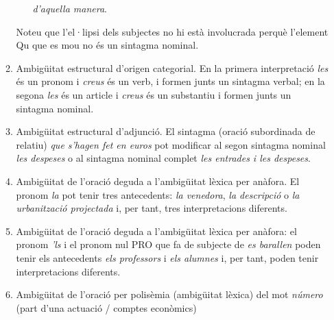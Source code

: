 \begin{enumerate}
\begin{enumerate}
\begin{itemize}
    \emph{d'aquella manera}.
     \end{itemize}
    Noteu que l'el·lipsi dels subjectes no hi està involucrada perquè
    l'element Qu que es mou no és un sintagma nominal.
  \item Ambigüitat estructural d'origen categorial. En la primera
    interpretació \emph{les} és un pronom i \emph{creus} és un verb, i
    formen junts un sintagma verbal; en la segona \emph{les} és un
    article i \emph{creus} és un substantiu i formen junts un sintagma
    nominal.
  \item Ambigüitat estructural d'adjunció. El sintagma (oració
    subordinada de relatiu) \emph{que s'hagen
    fet en euros} pot modificar al segon sintagma nominal \emph{les
    despeses} o al sintagma nominal complet \emph{les entrades i les
    despeses}.
\item Ambigüitat de l'oració deguda a l'ambigüitat lèxica per anàfora.
  El pronom \emph{la} pot tenir tres antecedents: \emph{la venedora},
  \emph{la descripció} o \emph{la urbanització projectada} i, per
  tant, tres interpretacions diferents.
\item Ambigüitat de l'oració deguda a l'ambigüitat lèxica per anàfora:
  el pronom \emph{'ls} i el pronom nul PRO que fa de subjecte de
  \emph{es barallen} poden tenir els antecedents \emph{els professors}
  i \emph{els alumnes} i, per tant, poden tenir interpretacions
  diferents.
\item Ambigüitat de l'oració per polisèmia (ambigüitat lèxica) del mot
  \emph{número} (part d'una actuació / comptes econòmics)

\end{enumerate}
\end{enumerate}

